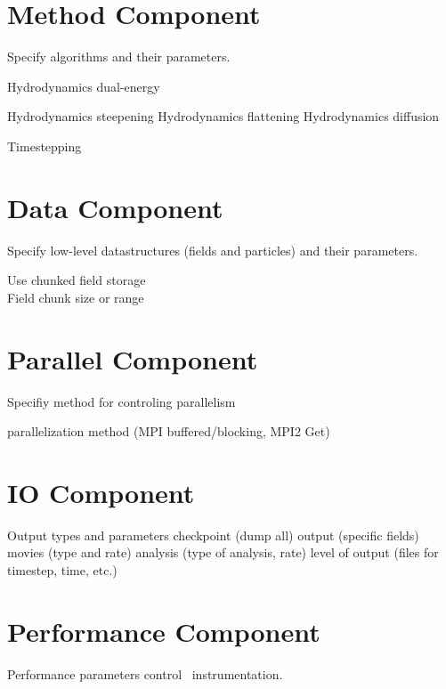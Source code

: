 \section{Method Component} 

Specify algorithms and their parameters.

Hydrodynamics dual-energy

Hydrodynamics steepening
Hydrodynamics flattening
Hydrodynamics diffusion

Timestepping

\section{Data Component}

Specify low-level datastructures (fields and particles) and their
parameters.

Use chunked field storage \\
Field chunk size or range

\section{Parallel Component}  \label{s:component-parallel}

Specifiy method for controling parallelism

   parallelization method (MPI buffered/blocking, MPI2 Get)


\section{IO Component} 

Output types and parameters
 checkpoint (dump all)
 output (specific fields)
 movies (type and rate)
 analysis (type of analysis, rate)
 level of output (files for timestep, time, etc.)


\section{Performance Component} 

Performance parameters control \lcaperf\ instrumentation.
